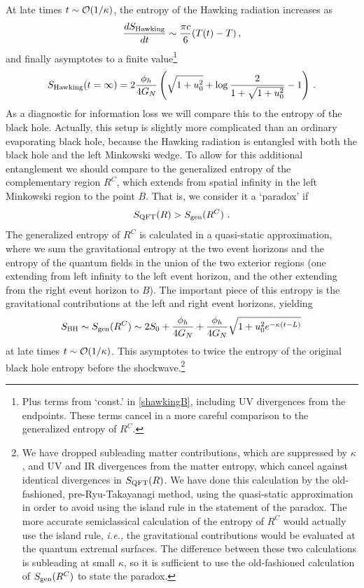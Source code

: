 \documentclass[12pt]{article}
\newcommand{\p}{\partial}
\newcommand{\f}{\frac}
\newcommand{\be}{\begin{equation}}
\newcommand{\ee}{\end{equation}}
\def\be{\begin{eqnarray}}
\def\ee{\end{eqnarray}}
\let\l=\lambda \let\m=\mu \let\n=\nu \let\x=\xi \let\p=\phi \let\r=v
\let\f=\frac
\def\be{\begin{equation}}
\def\ee{\end{equation}}
\def\ba{\begin{eqnarray}}
\def\ea{\end{eqnarray}}
\renewcommand{\p}{\partial}
\numberwithin{equation}{section}
\def\m{{\mu}}
\def\n{{\nu}}
\def\p{{\phi}}
\def\s{\sqrt}
\def\CO{{\cal O}}
\def\be{\begin{equation}}
\def\ee{\end{equation}}
\def\ba{\begin{eqnarray}}
\def\ea{\end{eqnarray}}
\def\r{\rightarrow}
\def\f {\frac}
\def\l{\left}
\def\r{\right}
\def\x{\bar{x}}
\def \be {\begin{equation}}
\def \ee {\end{equation}}
\renewcommand{\p}{\partial}
\newcommand{\Smatter}{S_{\rm QFT}}
\begin{document}
\begin{spacing}{1.1}
At late  times $t\sim\CO(1/\kappa)$, the entropy of the Hawking radiation increases as
  \ba
    \f{dS_{\rm Hawking}}{dt}\sim \f{\pi c}{6} (T(t)-T)\, ,%
    \ea
    and finally asymptotes to a finite value\footnote{Plus terms from `const.' in \eqref{shawkingB}, including UV divergences from the endpoints. These terms cancel in a more careful comparison to the generalized entropy of $R^C$.}
    \ba
      S_{\rm Hawking}(t=\infty)=%
      2\f{\phi_h}{4G_N}\l(\s{1+u^2_0}+\log\f{2}{1+\s{1+u_0^2}}-1\r)\, .
    \ea
As a diagnostic for information loss we will compare this to the entropy of the black hole. Actually, this setup is slightly more complicated than an ordinary evaporating black hole, because the Hawking radiation is entangled with both the black hole and the left Minkowski wedge. To allow for this additional entanglement we should compare to the generalized entropy of the complementary region $R^C$, which extends from spatial infinity in the left Minkowski region to the point $B$. That is, we consider it a `paradox' if 
\be
\Smatter(R) > S_{\rm gen}(R^C) \ .
\ee
The generalized entropy of $R^C$ is calculated in a quasi-static approximation, where we sum the gravitational entropy at the two event horizons and the entropy of the quantum fields in the union of the two exterior regions (one extending from left infinity to the left event horizon, and the other extending from the right event horizon to $B$). The important piece of this entropy is the gravitational contributions at the left and right event horizons, yielding
\ba\label{sbhii}
S_{\rm BH} \sim S_{\rm gen}(R^C) \sim 2S_0+  \f{\phi_h}{4G_N}+\f{\phi_h}{4G_N}\s{1+u_0^2e^{-\kappa (t-L)}}\, 
\ea
at late times $t\sim\CO(1/\kappa)$. This asymptotes to twice the entropy of the original black hole entropy before the shockwave.\footnote{We have dropped subleading matter contributions, which are suppressed by $\kappa$, and UV and IR divergences from the matter entropy, which cancel against identical divergences in $\Smatter(R)$. We have done this calculation by the old-fashioned, pre-Ryu-Takayanagi method, using the quasi-static approximation in order to avoid using the island rule in the statement of the paradox. The more accurate semiclassical calculation of the entropy of $R^C$ would actually use the island rule, \textit{i.e.,} the gravitational contributions would be evaluated at the quantum extremal surfaces. The difference between these two calculations is subleading at small $\kappa$, so it is sufficient to use the old-fashioned calculation of $S_{\rm gen}(R^C)$ to state the paradox.}


\end{spacing}
\end{document}
